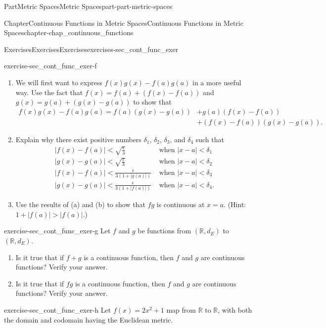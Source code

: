 \documentclass[oneside,10pt,]{book}
\numberwithin{equation}{chapter}
\newcommand{\R}{\mathbb{R}}
\newcommand{\lt}{<}
\newcommand{\gt}{>}
\newcommand{\amp}{&}
\begin{document}
\begin{partptx}{Part}{Metric Spaces}{}{Metric Spaces}{}{}{part-part-metric-spaces}
\begin{chapterptx}{Chapter}{Continuous Functions in Metric Spaces}{}{Continuous Functions in Metric Spaces}{}{}{chapter-chap_continuous_functions}
\begin{exercises-section}{Exercises}{Exercises}{}{Exercises}{}{}{exercises-sec_cont_func_exer}
\begin{divisionexercise}{6}{}{}{exercise-sec_cont_func_exer-f}
\begin{enumerate}[font=\bfseries,label=(\alph*),ref=\alph*]%
\item{}We will first want to express \(f(x)g(x) - f(a)g(a)\) in a more useful way. Use the fact that \(f(x) = f(a) + (f(x)-f(a))\) and \(g(x)  = g(a) + (g(x)-g(a))\) to show that%
\begin{align*}
f(x)g(x)-f(a)g(a) = f(a)(g(x)-g(a)) \amp + g(a)(f(x)-f(a))\\
\amp + (f(x)-f(a))(g(x)-g(a))\text{.}
\end{align*}
%
\item{}Explain why there exist positive numbers \(\delta_1\), \(\delta_2\), \(\delta_3\), and \(\delta_4\) such that%
\begin{align*}
|f(x)-f(a)| \lt  \sqrt{\frac{\epsilon}{3}} \amp \text{ when }  |x-a| \lt  \delta_1\\
|g(x)-g(a)| \lt   \sqrt{\frac{\epsilon}{3}}  \amp \text{ when }  |x-a| \lt  \delta_2\\
|f(x)-f(a)| \lt  \frac{\epsilon}{3(1+|g(a)|)}  \amp \text{ when }  |x-a| \lt  \delta_3\\
|g(x)-g(a)| \lt  \frac{\epsilon}{3(1+|f(a)|)}  \amp \text{ when }  |x-a| \lt  \delta_4\text{.}
\end{align*}
%
\item{}Use the results of (a) and (b) to show that \(fg\) is continuous at \(x=a\). (Hint: \(1+|f(a)| \gt |f(a)|\).)%
\end{enumerate}%
\end{divisionexercise}%
\begin{divisionexercise}{7}{}{}{exercise-sec_cont_func_exer-g}%
Let \(f\) and \(g\) be functions from \((\R,d_E)\) to \((\R,d_E)\).%
\begin{enumerate}[font=\bfseries,label=(\alph*),ref=\alph*]%
\item{}Is it true that if \(f+g\) is a continuous function, then \(f\) and \(g\) are continuous functions? Verify your answer.%
\item{}Is it true that if \(fg\) is a continuous function, then \(f\) and \(g\) are continuous functions? Verify your answer.%
\end{enumerate}%
\end{divisionexercise}%
\begin{divisionexercise}{8}{}{}{exercise-sec_cont_func_exer-h}%
Let \(f(x) = 2x^2+1\) map from \(\R\) to \(\R\), with both the domain and codomain having the Euclidean metric.%
\begin{enumerate}[font=\bfseries,label=(\alph*),ref=\alph*]%

\end{enumerate}
\end{divisionexercise}
\end{exercises-section}
\end{chapterptx}
\end{partptx}
\end{document}

